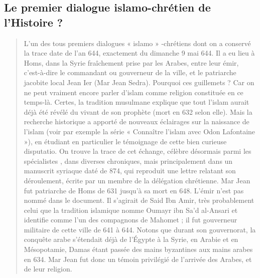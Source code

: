 \subsection{Le premier dialogue
islamo-chrétien de l’Histoire ?}
\begin{quote}
L’un des tous premiers dialogues « islamo » -chrétiens dont on a conservé la trace date de l’an 644, exactement du dimanche 9 mai 644. Il a eu lieu à Homs, dans la Syrie fraîchement prise par les Arabes, entre leur émir, c’est-à-dire le commandant ou gouverneur de la ville, et le patriarche jacobite local Jean Ier (Mar Jean Sedra). Pourquoi ces guillemets ? Car on ne peut vraiment encore parler d’islam comme religion constituée en ce temps-là. Certes, la tradition musulmane explique que tout l’islam aurait déjà été révélé du vivant de son prophète (mort en 632 selon elle). Mais la recherche historique a apporté de nouveaux éclairages sur la naissance de l’islam (voir par exemple la série « Connaître l’islam avec Odon Lafontaine »), en étudiant en particulier le témoignage de cette bien curieuse disputatio.
On trouve la trace de cet échange, célèbre désormais parmi les spécialistes , dans diverses chroniques, mais principalement dans un manuscrit syriaque daté de 874, qui reproduit une lettre relatant son déroulement, écrite par un membre de la délégation chrétienne.
Mar Jean fut patriarche de Homs de 631 jusqu’à sa mort en 648. L’émir n’est pas nommé dans le document. Il s’agirait de Said Ibn Amir, très probablement celui que la tradition islamique nomme Oumayr ibn Sa’d al-Ansari et identifie comme l’un des compagnons de Mahomet ; il fut gouverneur militaire de cette ville de 641 à 644. Notons que durant son gouvernorat, la conquête arabe s’étendait déjà de l’Égypte à la Syrie, en Arabie et en Mésopotamie, Damas étant passée des mains byzantines aux mains arabes en 634. Mar Jean fut donc un témoin privilégié de l’arrivée des Arabes, et de leur religion.
 



\end{quote}
